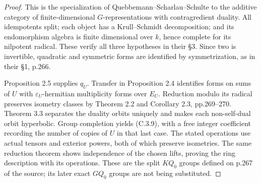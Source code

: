 \begin{proof}
This is the specialization of Quebbemann--Scharlau--Schulte
\cite[Propositions 2.4--2.5 and Theorems 3.2--3.3, pp.271--273]{C-QSS1979}
to the additive category of finite-dimensional $G$-representations with
contragredient duality. All idempotents split; each object has a
Krull--Schmidt decomposition; and its endomorphism algebra is finite
dimensional over $k$, hence complete for its nilpotent radical. These
verify all three hypotheses in their \S3. Since two is invertible,
quadratic and symmetric forms are identified by symmetrization, as in
their \S1, p.266.

Proposition 2.5 supplies $q_U$. Transfer in Proposition 2.4 identifies
forms on sums of $U$ with $\varepsilon_U$-hermitian multiplicity forms
over $E_U$. Reduction modulo its radical preserves isometry classes
by Theorem 2.2 and Corollary 2.3, pp.269--270. Theorem 3.3 separates
the duality orbits uniquely and makes each non-self-dual orbit
hyperbolic. Group completion yields (C.3.9), with a free integer
coefficient recording the number of copies of $U$ in that last case.
The stated operations use actual tensors and exterior powers, both of
which preserve isometries. The same reduction theorem shows independence
of the chosen lifts, proving the ring description with its operations.
These are the split $KQ_0$ groups defined on p.267 of the source; its later
exact $GQ_0$ groups are not being substituted.
\end{proof}

